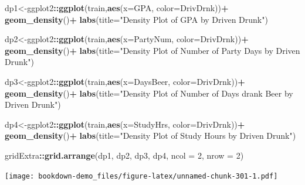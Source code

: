 \documentclass[
]{book}
\newenvironment{Shaded}{\begin{snugshade}}{\end{snugshade}}
\newcommand{\AttributeTok}[1]{\textcolor[rgb]{0.13,0.29,0.53}{#1}}
\newcommand{\DecValTok}[1]{\textcolor[rgb]{0.00,0.00,0.81}{#1}}
\newcommand{\FunctionTok}[1]{\textcolor[rgb]{0.13,0.29,0.53}{\textbf{#1}}}
\newcommand{\NormalTok}[1]{#1}
\newcommand{\OtherTok}[1]{\textcolor[rgb]{0.56,0.35,0.01}{#1}}
\newcommand{\SpecialCharTok}[1]{\textcolor[rgb]{0.81,0.36,0.00}{\textbf{#1}}}
\newcommand{\StringTok}[1]{\textcolor[rgb]{0.31,0.60,0.02}{#1}}
\begin{document}
\begin{Shaded}
\begin{Highlighting}[]
\NormalTok{dp1}\OtherTok{\textless{}{-}}\NormalTok{ggplot2}\SpecialCharTok{::}\FunctionTok{ggplot}\NormalTok{(train,}\FunctionTok{aes}\NormalTok{(}\AttributeTok{x=}\NormalTok{GPA, }\AttributeTok{color=}\NormalTok{DrivDrnk))}\SpecialCharTok{+}
  \FunctionTok{geom\_density}\NormalTok{()}\SpecialCharTok{+}
  \FunctionTok{labs}\NormalTok{(}\AttributeTok{title=}\StringTok{"Density Plot of GPA by Driven Drunk"}\NormalTok{)}

\NormalTok{dp2}\OtherTok{\textless{}{-}}\NormalTok{ggplot2}\SpecialCharTok{::}\FunctionTok{ggplot}\NormalTok{(train,}\FunctionTok{aes}\NormalTok{(}\AttributeTok{x=}\NormalTok{PartyNum, }\AttributeTok{color=}\NormalTok{DrivDrnk))}\SpecialCharTok{+}
  \FunctionTok{geom\_density}\NormalTok{()}\SpecialCharTok{+}
  \FunctionTok{labs}\NormalTok{(}\AttributeTok{title=}\StringTok{"Density Plot of Number of Party Days by Driven Drunk"}\NormalTok{)}

\NormalTok{dp3}\OtherTok{\textless{}{-}}\NormalTok{ggplot2}\SpecialCharTok{::}\FunctionTok{ggplot}\NormalTok{(train,}\FunctionTok{aes}\NormalTok{(}\AttributeTok{x=}\NormalTok{DaysBeer, }\AttributeTok{color=}\NormalTok{DrivDrnk))}\SpecialCharTok{+}
  \FunctionTok{geom\_density}\NormalTok{()}\SpecialCharTok{+}
  \FunctionTok{labs}\NormalTok{(}\AttributeTok{title=}\StringTok{"Density Plot of Number of Days drank Beer by Driven Drunk"}\NormalTok{)}

\NormalTok{dp4}\OtherTok{\textless{}{-}}\NormalTok{ggplot2}\SpecialCharTok{::}\FunctionTok{ggplot}\NormalTok{(train,}\FunctionTok{aes}\NormalTok{(}\AttributeTok{x=}\NormalTok{StudyHrs, }\AttributeTok{color=}\NormalTok{DrivDrnk))}\SpecialCharTok{+}
  \FunctionTok{geom\_density}\NormalTok{()}\SpecialCharTok{+}
  \FunctionTok{labs}\NormalTok{(}\AttributeTok{title=}\StringTok{"Density Plot of Study Hours by Driven Drunk"}\NormalTok{)}

\NormalTok{gridExtra}\SpecialCharTok{::}\FunctionTok{grid.arrange}\NormalTok{(dp1, dp2, dp3, dp4, }\AttributeTok{ncol =} \DecValTok{2}\NormalTok{, }\AttributeTok{nrow =} \DecValTok{2}\NormalTok{)}
\end{Highlighting}
\end{Shaded}

\texttt{[image: bookdown-demo\_files/figure-latex/unnamed-chunk-301-1.pdf]}
\end{document}
